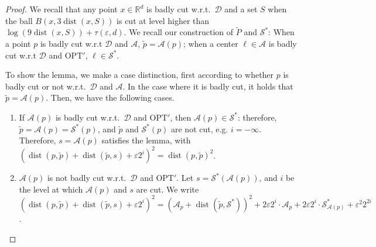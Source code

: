 \documentclass[11pt]{article}
\newcommand{\R}{\mathbb R}
\newcommand{\opt}{\text{OPT}}
\newcommand{\eps}{\varepsilon}
\renewcommand{\tilde}{\widetilde}
\newcommand{\calD}{\mathcal {D}}
\newcommand{\calS}{\mathcal {S}}
\newcommand{\calL}{\mathcal{A}}
\newcommand{\offset}{\tau(\eps, d)}
\DeclareMathOperator{\dist}{dist}
\begin{document}
\begin{proof}

We recall that any point $x \in \R^d$ is badly cut w.r.t.\ $\calD$ and  a set  $S$ when the ball $B(x, 3\dist(x, S))$ is cut at level higher than $\log(9 \dist(x, S)) + \offset$. 
We recall our construction of $\tilde P$ and $\calS^*$: When a point $p$ is badly cut w.r.t $\calD$ and $\calL$, $\tilde p = \calL(p)$; when a center $\ell \in \calL$ is badly cut w.r.t $\calD$ and $\opt'$, $\ell \in \calS^*$. 



To show the lemma, we make a case distinction, first according to whether $p$ is badly cut or not w.r.t.~$\calD$ and $\calL$. 
In the case where it is badly cut, it holds that $\tilde p = \calL(p)$. Then, we have the following cases.


\begin{enumerate}
 \item If $\calL(p)$ is badly cut w.r.t.\ $\calD$ and $\opt'$, then $\calL(p) \in \calS^*$: therefore, 
$\tilde p = \calL(p) =  \calS^*(p)$, and $\tilde p$ and $ \calS^*(p)$ are not cut, e.g. $i=-\infty$. Therefore, $s = \calL(p)$ satisfies the lemma, with $(\dist(p, \tilde p) + \dist(\tilde p, s) + \eps 2^i)^2 = \dist(p, \tilde p)^2$. 
 \item $\calL(p)$ is not badly cut w.r.t.\ $\calD$ and $\opt'$. Let $s = \calS^*(\calL(p))$, and $i$ be the level at which $\calL(p)$ and $s$ are cut. We write 
 $(\dist(p, \tilde p) + \dist(\tilde p, s) + \eps 2^i)^2 = (\calL_p + \dist(\tilde p, \calS^*))^2 + 2\eps  2^i \cdot \calL_p + 2 \eps 2^i\cdot \calS^*_{\calL(p)} + \eps^2 2^{2i}$. 
 

\end{enumerate}
\end{proof}
\end{document}
